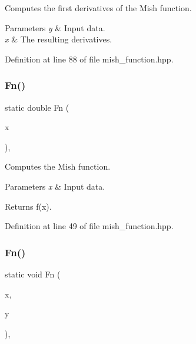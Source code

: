 Computes the first derivatives of the Mish function. 


\begin{DoxyParams}{Parameters}
{\em y} & Input data. \\
\hline
{\em x} & The resulting derivatives. \\
\hline
\end{DoxyParams}


Definition at line 88 of file mish\+\_\+function.\+hpp.

\mbox{\label{classmlpack_1_1ann_1_1MishFunction_a11bd9a1195e6b107f9fee73643bc328b}} 
\subsubsection{Fn()\hspace{0.1cm}{\footnotesize\ttfamily [1/2]}}
{\footnotesize\ttfamily static double Fn (\begin{DoxyParamCaption}\item[{const double}]{x }\end{DoxyParamCaption})\hspace{0.3cm}{\ttfamily [inline]}, {\ttfamily [static]}}



Computes the Mish function. 


\begin{DoxyParams}{Parameters}
{\em x} & Input data. \\
\hline
\end{DoxyParams}
\begin{DoxyReturn}{Returns}
f(x). 
\end{DoxyReturn}


Definition at line 49 of file mish\+\_\+function.\+hpp.

\mbox{\label{classmlpack_1_1ann_1_1MishFunction_af6cf5da90eb6312e3e25c9b8bd9c3527}} 
\subsubsection{Fn()\hspace{0.1cm}{\footnotesize\ttfamily [2/2]}}
{\footnotesize\ttfamily static void Fn (\begin{DoxyParamCaption}\item[{const Input\+Vec\+Type \&}]{x,  }\item[{Output\+Vec\+Type \&}]{y }\end{DoxyParamCaption})\hspace{0.3cm}{\ttfamily [inline]}, {\ttfamily [static]}}



